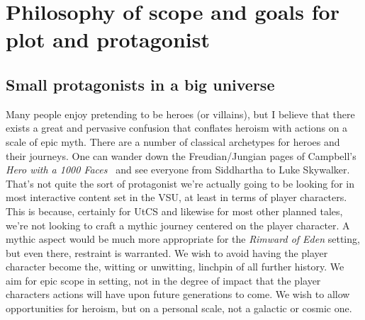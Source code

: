 

\section{Philosophy of scope and goals for plot and protagonist}
\label{sec:plottingphilosophy}

\subsection{Small protagonists in a big universe}
Many people enjoy pretending to be heroes (or villains), but I believe
that there exists a great and pervasive confusion that conflates
heroism with actions on a scale of epic myth. There are a number of
classical archetypes for heroes and their journeys. One can wander
down the Freudian/Jungian pages of Campbell's {\em Hero with a 1000
Faces}~\cite{herowith1000faces} and see everyone from Siddhartha to
Luke Skywalker.  That's not quite the sort of protagonist we're
actually going to be looking for in most interactive content set in
the VSU, at least in terms of player characters. This is because,
certainly for UtCS and likewise for most other planned tales, we're
not looking to craft a mythic journey centered on the player
character. A mythic aspect would be much more appropriate for the {\it
Rimward of Eden} setting, but even there, restraint is warranted. We
wish to avoid having the player character become the, witting or
unwitting, linchpin of all further history. We aim for epic scope in
setting, not in the degree of impact that the player characters
actions will have upon future generations to come. We wish to allow
opportunities for heroism, but on a personal scale, not a galactic or
cosmic one.

